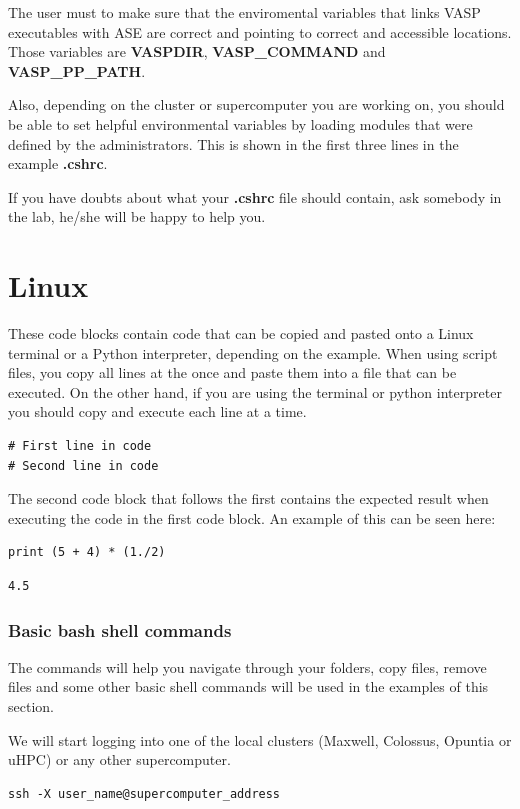 \documentclass[11pt]{article}
\begin{document}
The user must to make sure that the enviromental variables that links VASP executables with ASE are correct and pointing to correct and accessible locations. Those variables are \textbf{VASPDIR}, \textbf{VASP\_COMMAND} and \textbf{VASP\_PP\_PATH}.

Also, depending on the cluster or supercomputer you are working on, you should be able to set helpful environmental variables by loading modules that were defined by the administrators. This is shown in the first three lines in the example \textbf{.cshrc}.

If you have doubts about what your \textbf{.cshrc}  file should contain, ask somebody in the lab, he/she will be happy to help you.


\section{Linux}
\label{sec-3}
These code blocks contain code that can be copied and pasted onto a Linux terminal or a Python interpreter, depending on the example. When using script files, you copy all lines at the once and paste them into a file that can be executed. On the other hand, if you are using the terminal or python interpreter you should copy and execute each line at a time.
\begin{verbatim}
# First line in code 
# Second line in code
\end{verbatim}

The second code block that follows the first contains the expected result when executing the code in the first code block. An example of this can be seen here:
\begin{verbatim}
print (5 + 4) * (1./2)
\end{verbatim}

\begin{verbatim}
4.5
\end{verbatim}

\subsubsection{Basic bash shell commands}
\label{sec-3-0-1}
The commands will help you navigate through your folders, copy files, remove files and some other basic shell commands will be used in the examples of this section. 

We will start logging into one of the local clusters (Maxwell, Colossus, Opuntia or uHPC) or any other supercomputer.
\begin{verbatim}
ssh -X user_name@supercomputer_address
\end{verbatim}
\end{document}
